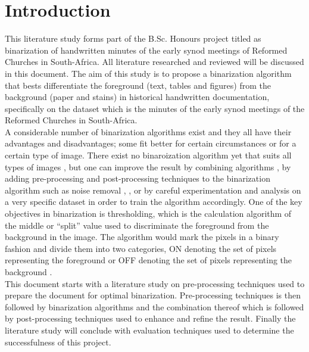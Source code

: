 \documentclass[11pt]{article}
\begin{document}
	

    \renewcommand{\cftsecleader}{\cftdotfill{\cftdotsep}} %
    \tableofcontents
    \thispagestyle{empty}
    \clearpage

    \listoffigures
    \thispagestyle{empty}
    \clearpage

    \setcounter{page}{1}

	\section{Introduction}
		This literature study forms part of the B.Sc. Honours project titled as binarization of handwritten minutes of the early synod meetings of Reformed Churches in South-Africa. All literature researched and reviewed will be discussed in this document. The aim of this study is to propose a binarization algorithm that bests differentiate the foreground (text, tables and figures) from the background (paper and stains) in historical handwritten documentation, specifically on the dataset which is the minutes of the early synod meetings of the Reformed Churches in South-Africa.\\

		A considerable number of binarization algorithms exist and they all have their advantages and disadvantages; some fit better for certain circumstances or for a certain type of image. There exist no binaroization algorithm yet that suits all types of images \cite{lins2015binarizing}, but one can improve the result by combining algorithms \cite{ntogas2008binarization}, by adding pre-processing and post-processing techniques to the binarization algorithm such as noise removal \cite{agrawal2011stroke}, \cite{lins2015binarizing}, or by careful experimentation and analysis on a very specific dataset in order to train the algorithm accordingly. One of the key objectives in binarization is thresholding, which is the calculation algorithm of the middle or ``split'' value used to discriminate the foreground from the background in the image. The algorithm would mark the pixels in a binary fashion and divide them into two categories, ON denoting the set of pixels representing the foreground or OFF denoting the set of pixels representing the background \cite{o1995document}.\\

		This document starts with a literature study on pre-processing techniques used to prepare the document for optimal binarization. Pre-processing techniques is then followed by binarization algorithms and the combination thereof which is followed by post-processing techniques used to enhance and refine the result. Finally the literature study will conclude with evaluation techniques used to determine the successfulness of this project.
\end{document}
